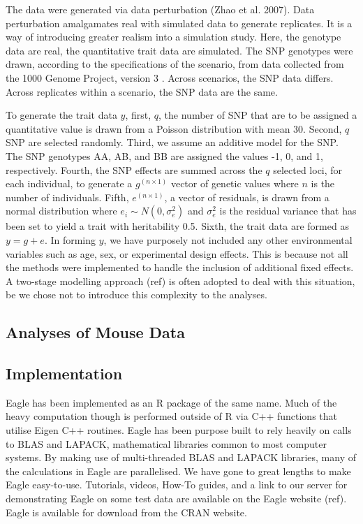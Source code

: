 \documentclass{article}
\begin{document}
The data were generated via data perturbation (Zhao et al. 2007). Data perturbation amalgamates real with simulated data to generate replicates. 
It is a way of introducing greater realism into a simulation study. 
 Here, the genotype data are real, the 
quantitative trait data are simulated. 
 The SNP genotypes were drawn, 
according to the specifications of the scenario, from data collected from the 1000 Genome Project, version 3   \cite{10002010map}. 
Across scenarios, the SNP data differs. Across replicates within a scenario, the SNP data are the same. 

To generate the trait data $y$, first, $q$, the number of SNP that are to be assigned a quantitative value is drawn from a Poisson distribution with 
mean 30. Second, $q$ SNP are selected randomly. Third, we assume an additive model for the SNP. The SNP genotypes AA, AB, and BB 
are assigned the values -1, 0, and 1, respectively. Fourth, the SNP effects are summed across the $q$ selected loci, for each individual, to 
generate a $g^{(n \times 1)}$ vector of genetic values where $n$ is the number of individuals. 
Fifth, $e^{(n \times 1)}$, a vector of residuals, is drawn from a normal distribution where $e_i \sim N(0, \sigma^2_e)$ and $\sigma^2_e$ is 
the residual variance that has been set to yield a trait with heritability 0.5. Sixth,  the trait data are formed as $y =  g + e$.  
In forming $y$, we have purposely not included any other environmental variables such as age, sex, or experimental design effects. This is because 
not all the methods were implemented to handle the inclusion of additional fixed effects. A two-stage modelling approach (ref) 
is often adopted to deal with this situation, be we chose not to introduce this complexity to the analyses.  


\subsection{Analyses of Mouse Data}




\subsection{Implementation}

Eagle has been implemented as an R package of the same name. Much of the heavy computation though is performed outside of R 
via C++ functions that utilise Eigen C++ routines. Eagle has been purpose built to rely heavily on calls to BLAS and LAPACK, 
mathematical libraries common to most computer systems. By making use of multi-threaded  BLAS and LAPACK libraries, many of the 
calculations in Eagle are parallelised. We have gone to great lengths to make Eagle easy-to-use. Tutorials, videos, How-To guides, and 
a link to our server for demonstrating Eagle on some test data are available on the Eagle website (ref).  
Eagle is available for download from the CRAN website. 
\end{document}
